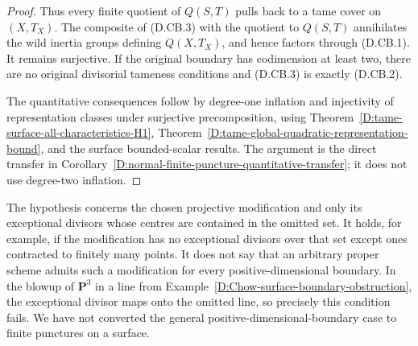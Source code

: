 \begin{proof}
Thus every finite quotient of $Q(S,T)$ pulls back to a tame cover
on $(X,T_X)$. The composite of (D.CB.3) with the quotient to $Q(S,T)$
annihilates the wild inertia groups defining $Q(X,T_X)$, and hence
factors through (D.CB.1). It remains surjective. If the original
boundary has codimension at least two, there are no original
divisorial tameness conditions and (D.CB.3) is exactly (D.CB.2).

The quantitative consequences follow by degree-one inflation and
injectivity of representation classes under surjective precomposition,
using Theorem~\ref{D:tame-surface-all-characteristics-H1},
Theorem~\ref{D:tame-global-quadratic-representation-bound}, and the
surface bounded-scalar results. The argument is the direct transfer
in Corollary~\ref{D:normal-finite-puncture-quantitative-transfer}; it
does not use degree-two inflation.
\end{proof}

\begin{remark}
The hypothesis concerns the chosen projective modification and only
its exceptional divisors whose centres are contained in the omitted
set. It holds, for example, if the modification has no exceptional
divisors over that set except ones contracted to finitely many points.
It does not say that an arbitrary proper scheme admits such a
modification for every positive-dimensional boundary. In the blowup
of $\mathbf P^3$ in a line from
Example~\ref{D:Chow-surface-boundary-obstruction}, the exceptional
divisor maps onto the omitted line, so precisely this condition fails.
We have not converted the general positive-dimensional-boundary case
to finite punctures on a surface.
\end{remark}
